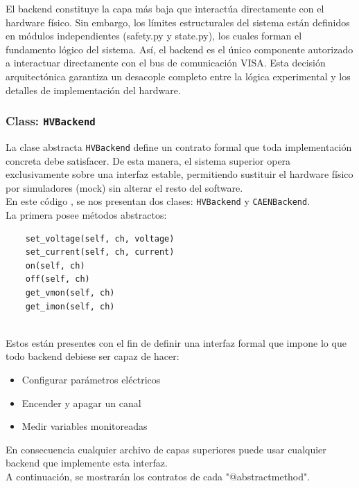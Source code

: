 \documentclass{article}
\begin{document}
El backend constituye la capa más baja que interactúa directamente con el hardware físico. Sin embargo, los límites estructurales del sistema están definidos en módulos independientes (safety.py y state.py), los cuales forman el fundamento lógico del sistema. Así, el backend es el único componente autorizado a interactuar directamente con el bus de comunicación VISA. Esta decisión arquitectónica garantiza un desacople completo entre la lógica experimental y los detalles de implementación del hardware.\\

\subsubsection{Class: \texttt{HVBackend}}

La clase abstracta \texttt{HVBackend} define un contrato formal que toda implementación concreta debe satisfacer. De esta manera, el sistema superior opera exclusivamente sobre una interfaz estable, permitiendo sustituir el hardware físico por simuladores (mock) sin alterar el resto del software.\\


En este código , se nos presentan dos clases: \texttt{HVBackend} y \texttt{CAENBackend}.\\


La primera posee métodos abstractos:
\begin{lstlisting}
    set_voltage(self, ch, voltage)
    set_current(self, ch, current)
    on(self, ch)
    off(self, ch)
    get_vmon(self, ch)
    get_imon(self, ch)

\end{lstlisting}\\
Estos están presentes con el fin de definir una interfaz formal que impone lo que todo backend debiese ser capaz de hacer:
\begin{itemize}
    \item Configurar parámetros eléctricos
    \item Encender y apagar un canal
    \item Medir variables monitoreadas
\end{itemize}
En consecuencia cualquier archivo  de capas superiores puede usar cualquier backend que implemente esta interfaz.\\

A continuación, se mostrarán los contratos de cada "@abstractmethod".\\
\end{document}
